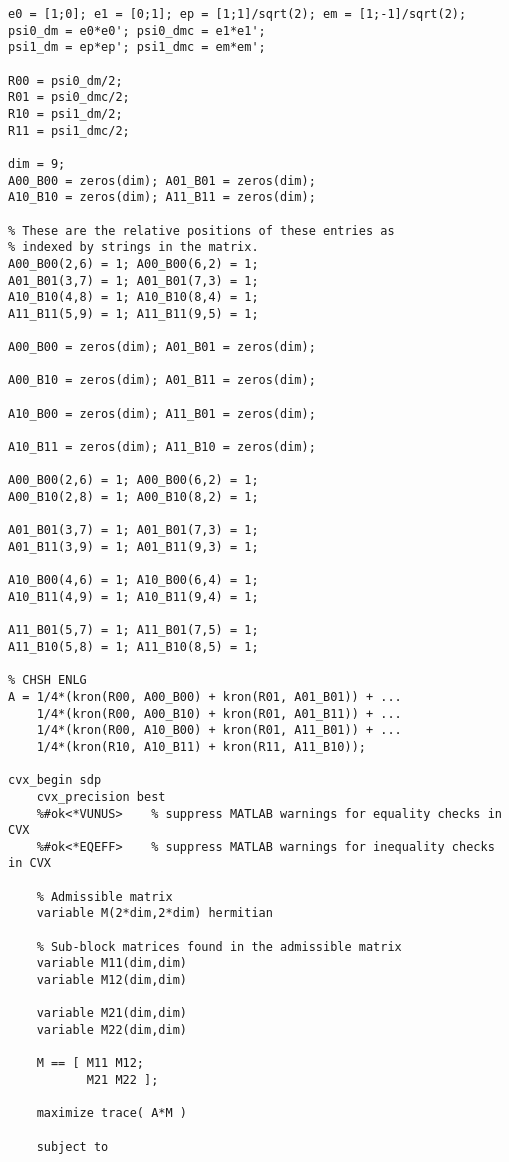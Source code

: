 \begin{verbatim}
e0 = [1;0]; e1 = [0;1]; ep = [1;1]/sqrt(2); em = [1;-1]/sqrt(2);
psi0_dm = e0*e0'; psi0_dmc = e1*e1';
psi1_dm = ep*ep'; psi1_dmc = em*em';

R00 = psi0_dm/2;
R01 = psi0_dmc/2; 
R10 = psi1_dm/2;
R11 = psi1_dmc/2;  

dim = 9;
A00_B00 = zeros(dim); A01_B01 = zeros(dim); 
A10_B10 = zeros(dim); A11_B11 = zeros(dim); 

% These are the relative positions of these entries as
% indexed by strings in the matrix. 
A00_B00(2,6) = 1; A00_B00(6,2) = 1;
A01_B01(3,7) = 1; A01_B01(7,3) = 1;
A10_B10(4,8) = 1; A10_B10(8,4) = 1;
A11_B11(5,9) = 1; A11_B11(9,5) = 1;

A00_B00 = zeros(dim); A01_B01 = zeros(dim); 

A00_B10 = zeros(dim); A01_B11 = zeros(dim);

A10_B00 = zeros(dim); A11_B01 = zeros(dim); 

A10_B11 = zeros(dim); A11_B10 = zeros(dim); 

A00_B00(2,6) = 1; A00_B00(6,2) = 1;
A00_B10(2,8) = 1; A00_B10(8,2) = 1;

A01_B01(3,7) = 1; A01_B01(7,3) = 1;
A01_B11(3,9) = 1; A01_B11(9,3) = 1;

A10_B00(4,6) = 1; A10_B00(6,4) = 1;
A10_B11(4,9) = 1; A10_B11(9,4) = 1;

A11_B01(5,7) = 1; A11_B01(7,5) = 1;
A11_B10(5,8) = 1; A11_B10(8,5) = 1;

% CHSH ENLG
A = 1/4*(kron(R00, A00_B00) + kron(R01, A01_B01)) + ...
    1/4*(kron(R00, A00_B10) + kron(R01, A01_B11)) + ...
    1/4*(kron(R00, A10_B00) + kron(R01, A11_B01)) + ...
    1/4*(kron(R10, A10_B11) + kron(R11, A11_B10));

cvx_begin sdp
	cvx_precision best
    %#ok<*VUNUS>    % suppress MATLAB warnings for equality checks in CVX
    %#ok<*EQEFF>    % suppress MATLAB warnings for inequality checks in CVX 
    
    % Admissible matrix
    variable M(2*dim,2*dim) hermitian
    
    % Sub-block matrices found in the admissible matrix
    variable M11(dim,dim)
    variable M12(dim,dim)
    
    variable M21(dim,dim)
    variable M22(dim,dim)
            
    M == [ M11 M12;
    	   M21 M22 ];
       
    maximize trace( A*M )      
    
    subject to 
 

\end{verbatim}
